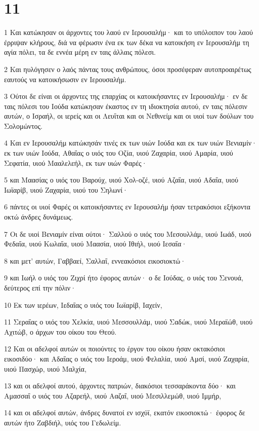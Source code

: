 \chapter{11}

\par 1 Και κατώκησαν οι άρχοντες του λαού εν Ιερουσαλήμ· και το υπόλοιπον του λαού έρριψαν κλήρους, διά να φέρωσιν ένα εκ των δέκα να κατοικήση εν Ιερουσαλήμ τη αγία πόλει, τα δε εννέα μέρη εν ταις άλλαις πόλεσι.
\par 2 Και ηυλόγησεν ο λαός πάντας τους ανθρώπους, όσοι προσέφεραν αυτοπροαιρέτως εαυτούς να κατοικήσωσιν εν Ιερουσαλήμ.
\par 3 Ούτοι δε είναι οι άρχοντες της επαρχίας οι κατοικήσαντες εν Ιερουσαλήμ· εν δε ταις πόλεσι του Ιούδα κατώκησαν έκαστος εν τη ιδιοκτησία αυτού, εν ταις πόλεσιν αυτών, ο Ισραήλ, οι ιερείς και οι Λευΐται και οι Νεθινείμ και οι υιοί των δούλων του Σολομώντος.
\par 4 Και εν Ιερουσαλήμ κατώκησάν τινές εκ των υιών Ιούδα και εκ των υιών Βενιαμίν· εκ των υιών Ιούδα, Αθαΐας ο υιός του Οζία, υιού Ζαχαρία, υιού Αμαρία, υιού Σεφατία, υιού Μααλελεήλ, εκ των υιών Φαρές·
\par 5 και Μαασίας ο υιός του Βαρούχ, υιού Χολ-οζέ, υιού Αζαΐα, υιού Αδαΐα, υιού Ιωϊαρίβ, υιού Ζαχαρία, υιού του Σηλωνί·
\par 6 πάντες οι υιοί Φαρές οι κατοικήσαντες εν Ιερουσαλήμ ήσαν τετρακόσιοι εξήκοντα οκτώ άνδρες δυνάμεως.
\par 7 Οι δε υιοί Βενιαμίν είναι ούτοι· Σαλλού ο υιός του Μεσουλλάμ, υιού Ιωάδ, υιού Φεδαΐα, υιού Κωλαΐα, υιού Μαασία, υιού Ιθιήλ, υιού Ιεσαΐα·
\par 8 και μετ' αυτών, Γαββαεί, Σαλλαΐ, εννεακόσιοι εικοσιοκτώ·
\par 9 και Ιωήλ ο υιός του Ζιχρί ήτο έφορος αυτών· ο δε Ιούδας, ο υιός του Σενουά, δεύτερος επί την πόλιν·
\par 10 Εκ των ιερέων, Ιεδαΐας ο υιός του Ιωϊαρίβ, Ιαχείν,
\par 11 Σεραΐας ο υιός του Χελκία, υιού Μεσσουλλάμ, υιού Σαδώκ, υιού Μεραϊώθ, υιού Αχιτώβ, ο άρχων του οίκου του Θεού.
\par 12 Και οι αδελφοί αυτών οι ποιούντες το έργον του οίκου ήσαν οκτακόσιοι εικοσιδύο· και Αδαΐας ο υιός του Ιεροάμ, υιού Φελαλία, υιού Αμσί, υιού Ζαχαρία, υιού Πασχώρ, υιού Μαλχία,
\par 13 και οι αδελφοί αυτού, άρχοντες πατριών, διακόσιοι τεσσαράκοντα δύο· και Αμασσαΐ ο υιός του Αζαρεήλ, υιού Ααζαΐ, υιού Μεσιλλεμώθ, υιού Ιμμήρ,
\par 14 και οι αδελφοί αυτών, άνδρες δυνατοί εν ισχύϊ, εκατόν εικοσιοκτώ· έφορος δε αυτών ήτο Ζαβδιήλ, υιός του Γεδωλείμ.
